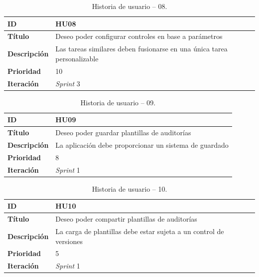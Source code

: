 \begin{table}[H]
    \begin{center}
        \begin{tabularx}{\textwidth}{| l | X |}
            \hline
            \textbf{ID}             & HU08 \\ \hline
            \textbf{Título}         & Deseo poder configurar controles en base a parámetros \\ \hline
            \textbf{Descripción}    & Las tareas similares deben fusionarse en una única tarea personalizable \\ \hline
            \textbf{Prioridad}      & 10 \\ \hline
            \textbf{Iteración}      & \textit{Sprint} 3\\ \hline
        \end{tabularx}
    \end{center}
    \caption{Historia de usuario -- 08.}
    \label{tab:hu08}
\end{table}


\begin{table}[H]
    \begin{center}
        \begin{tabularx}{\textwidth}{| l | X |}
            \hline
            \textbf{ID}             & HU09 \\ \hline
            \textbf{Título}         & Deseo poder guardar plantillas de auditorías \\ \hline
            \textbf{Descripción}    & La aplicación debe proporcionar un sistema de guardado \\ \hline
            \textbf{Prioridad}      & 8 \\ \hline
            \textbf{Iteración}      & \textit{Sprint} 1\\ \hline
        \end{tabularx}
    \end{center}
    \caption{Historia de usuario -- 09.}
    \label{tab:hu09}
\end{table}

\begin{table}[H]
    \begin{center}
        \begin{tabularx}{\textwidth}{| l | X |}
            \hline
            \textbf{ID}             & HU10 \\ \hline
            \textbf{Título}         & Deseo poder compartir plantillas de auditorías \\ \hline
            \textbf{Descripción}    & La carga de plantillas debe estar sujeta a un control de versiones \\ \hline
            \textbf{Prioridad}      & 5 \\ \hline
            \textbf{Iteración}      & \textit{Sprint} 1\\ \hline
        \end{tabularx}
    \end{center}
    \caption{Historia de usuario -- 10.}
    \label{tab:hu10}
\end{table}

